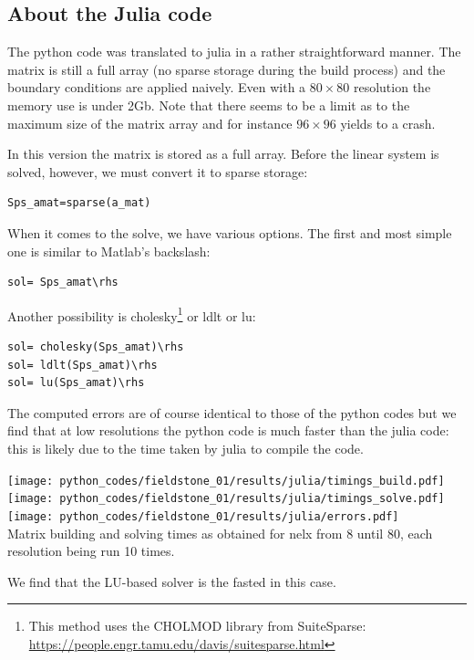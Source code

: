 \newpage
\subsection*{About the Julia code}

The python code was translated to julia in a rather straightforward manner. 
The matrix is still a full array (no sparse storage during the build process) 
and the boundary conditions
are applied naively. Even with a $80\times 80$ resolution the memory use is under 2Gb. 
Note that there seems to be a limit as to the maximum size of the matrix array 
and for instance $96\times 96$ yields to a crash.

In this version the matrix is stored as a full array. 
Before the linear system is solved, however, we must convert it to sparse storage:
\begin{verbatim}
Sps_amat=sparse(a_mat)
\end{verbatim}
When it comes to the solve, we have various options. The first and most 
simple one is similar to Matlab's backslash:
\begin{verbatim}
sol= Sps_amat\rhs
\end{verbatim}
Another possibility is cholesky\footnote{This method uses the CHOLMOD library from SuiteSparse:
\url{https://people.engr.tamu.edu/davis/suitesparse.html}} or ldlt or lu:
\begin{verbatim}
sol= cholesky(Sps_amat)\rhs
sol= ldlt(Sps_amat)\rhs
sol= lu(Sps_amat)\rhs
\end{verbatim}


The computed errors are of course identical to those of the python codes but we find that
at low resolutions the python code is much faster than the julia code: 
this is likely due to the time taken by julia to compile the code.
 

\begin{center}
\texttt{[image: python\_codes/fieldstone\_01/results/julia/timings\_build.pdf]}
\texttt{[image: python\_codes/fieldstone\_01/results/julia/timings\_solve.pdf]}\\
\texttt{[image: python\_codes/fieldstone\_01/results/julia/errors.pdf]}\\
{\captionfont Matrix building and solving times as obtained for nelx from 8 until 80, each 
resolution being run 10 times.}
\end{center}

We find that the LU-based solver is the fasted in this case.





